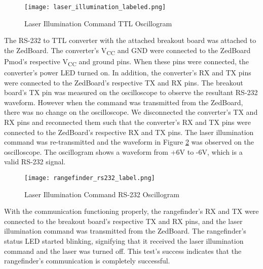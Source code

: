 \begin{figure}[H]
	\centerline{\texttt{[image: laser\_illumination\_labeled.png]}}
	\caption{Laser Illumination Command TTL Oscillogram}
	\label{laser_illumination}
\end{figure}

The RS-232 to TTL converter with the attached breakout board was attached to the ZedBoard. The converter's V\textsubscript{CC} and GND were connected to the ZedBoard Pmod's respective V\textsubscript{CC} and ground pins. When these pins were connected, the converter's power LED turned on. In addition, the converter's RX and TX pins were connected to the ZedBoard's respective TX and RX pins. The breakout board's TX pin was measured on the oscilloscope to observe the resultant RS-232 waveform. However when the command was transmitted from the ZedBoard, there was no change on the oscilloscope. We disconnected the converter's TX and RX pins and reconnected them such that the converter's RX and TX pins were connected to the ZedBoard's respective RX and TX pins. The laser illumination command was re-transmitted and the waveform in Figure \ref{rangefinder_rs232} was observed on the oscilloscope. The oscillogram shows a waveform from +6V to -6V, which is a valid RS-232 signal.

\begin{figure}[H]
	\centerline{\texttt{[image: rangefinder\_rs232\_label.png]}}
	\caption{Laser Illumination Command RS-232 Oscillogram}
	\label{rangefinder_rs232}
\end{figure}

With the communication functioning properly, the rangefinder's RX and TX were connected to the breakout board's respective TX and RX pins, and the laser illumination command was transmitted from the ZedBoard. The rangefinder's status LED started blinking, signifying that it received the laser illumination command and the laser was turned off. This test's success indicates that the rangefinder's communication is completely successful.


